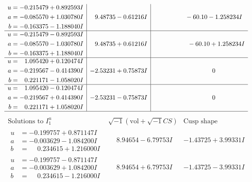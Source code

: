 \documentclass[1p]{elsarticle_modified}
\theoremstyle{definition}
\newcommand{\I}{\sqrt{-1}}
\begin{document}
$$\begin{array}{c|c|c}
\begin{aligned}
u &= -0.215479 + 0.892593 I \\
a &= -0.085570 + 1.030780 I \\
b &= -0.163375 - 1.188040 I\end{aligned}
 & \phantom{-}9.48735 - 0.61216 I & \phantom{-0.000000 }      -6
0. 10   - 1.258234 I \\ \hline\begin{aligned}
u &= -0.215479 - 0.892593 I \\
a &= -0.085570 - 1.030780 I \\
b &= -0.163375 + 1.188040 I\end{aligned}
 & \phantom{-}9.48735 + 0.61216 I & \phantom{-0.000000 -}     -6
0. 10   + 1.258234 I \\ \hline\begin{aligned}
u &= \phantom{-}1.095420 + 0.120474 I \\
a &= -0.219567 - 0.414390 I \\
b &= \phantom{-}0.221171 - 1.058020 I\end{aligned}
 & -2.53231 + 0.75873 I & \phantom{-0.000000 } 0 \\ \hline\begin{aligned}
u &= \phantom{-}1.095420 - 0.120474 I \\
a &= -0.219567 + 0.414390 I \\
b &= \phantom{-}0.221171 + 1.058020 I\end{aligned}
 & -2.53231 - 0.75873 I & \phantom{-0.000000 } 0\\
 \hline 
 \end{array}$$\newpage$$\begin{array}{c|c|c}  
\text{Solutions to }I^u_{1}& \I (\text{vol} + \sqrt{-1}CS) & \text{Cusp shape}\\
 \hline 
\begin{aligned}
u &= -0.199757 + 0.871147 I \\
a &= -0.003629 - 1.084200 I \\
b &= \phantom{-}0.234615 + 1.216000 I\end{aligned}
 & \phantom{-}8.94654 - 6.79753 I & -1.43725 + 3.99331 I \\ \hline\begin{aligned}
u &= -0.199757 - 0.871147 I \\
a &= -0.003629 + 1.084200 I \\
b &= \phantom{-}0.234615 - 1.216000 I\end{aligned}
 & \phantom{-}8.94654 + 6.79753 I & -1.43725 - 3.99331 I \\ \hline\begin{aligned}

\end{aligned}
\end{array}$$
\end{document}
